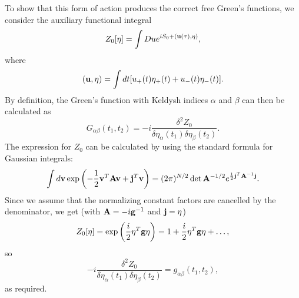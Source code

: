 To show that this form of action produces the correct free Green's functions, we consider the auxiliary functional integral
\begin{equation}
 Z_0[\eta] = \int Du e^{iS_0+(\mathbf{u}(\tau),\eta)},
\end{equation}
where 
\begin{equation}
 (\mathbf{u}, \eta) = \int dt [u_+(t)\eta_+(t) + u_-(t) \eta_-(t)].
\end{equation}
By definition, the Green's function with Keldysh indices $\alpha$ and $\beta$ can then be calculated as
\begin{equation}
 G_{\alpha\beta}(t_1,t_2) = -i \frac{\delta^2 Z_0}{\delta \eta_{\alpha}(t_1)\delta \eta_{\beta}(t_2)}.
\end{equation}
The expression for $Z_0$ can be calculated by using the standard formula for Gaussian integrals:
\begin{equation}
 \int d\mathbf{v} \exp\left(-\frac{1}{2}\mathbf{v}^T \mathbf{A} \mathbf{v} + \mathbf{j}^T \mathbf{v}\right) = (2\pi)^{N/2} \det\mathbf{A}^{-1/2} e^{\frac{1}{2} \mathbf{j}^T \mathbf{A}^{-1} \mathbf{j}}.
\end{equation}
Since we assume that the normalizing constant factors are cancelled by the denominator, we get (with $\mathbf{A}=-i\mathbf{g}^{-1}$ and $\mathbf{j}=\eta$)
\begin{equation}
 Z_0[\eta] = \exp\left(\frac{i}{2} \mathbf{\eta}^T \mathbf{g} \mathbf{\eta} \right)  = 1 + \frac{i}{2} \mathbf{\eta}^T \mathbf{g} \mathbf{\eta} + \dots,
\end{equation}
so 
\begin{equation}
 -i \frac{\delta^2 Z_0}{\delta \eta_{\alpha}(t_1)\delta \eta_{\beta}(t_2)} = g_{\alpha\beta}(t_1,t_2),
\end{equation}
as required.

